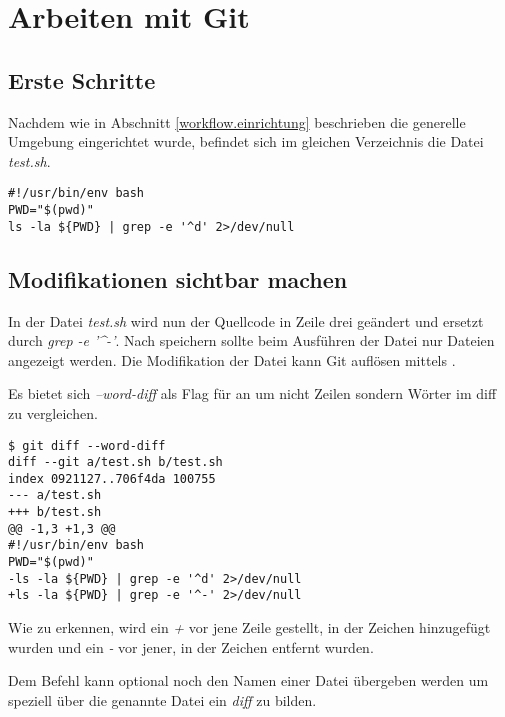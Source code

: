 \section{Arbeiten mit Git}
\label{work-with-git}

\subsection{Erste Schritte}
\label{work-with-git.first-steps}
Nachdem wie in Abschnitt \ref{workflow.einrichtung} beschrieben die generelle Umgebung eingerichtet wurde, befindet sich im gleichen Verzeichnis die Datei \textit{test.sh}.

\begin{verbatim}
#!/usr/bin/env bash
PWD="$(pwd)"
ls -la ${PWD} | grep -e '^d' 2>/dev/null
\end{verbatim}

\subsection{Modifikationen sichtbar machen}
\label{work-with-git.modifikation}
In der Datei \textit{test.sh} wird nun der Quellcode in Zeile drei geändert und ersetzt durch \textit{ grep -e '\^{}-'}. Nach speichern sollte beim Ausführen der Datei nur Dateien angezeigt werden. Die Modifikation der Datei kann Git auflösen mittels \textit{}.

\begin{INFO}
  Es bietet sich \textit{--word-diff} als Flag für \textit{} an um nicht Zeilen sondern Wörter im diff zu vergleichen.
\end{INFO}

\begin{verbatim}
$ git diff --word-diff
diff --git a/test.sh b/test.sh
index 0921127..706f4da 100755
--- a/test.sh
+++ b/test.sh
@@ -1,3 +1,3 @@
#!/usr/bin/env bash
PWD="$(pwd)"
-ls -la ${PWD} | grep -e '^d' 2>/dev/null
+ls -la ${PWD} | grep -e '^-' 2>/dev/null
\end{verbatim}

Wie zu erkennen, wird ein \textit{+} vor jene Zeile gestellt, in der Zeichen hinzugefügt wurden und ein \textit{-} vor jener, in der Zeichen entfernt wurden.

Dem Befehl \textit{} kann optional noch den Namen einer Datei übergeben werden um speziell über die genannte Datei ein \textit{diff} zu bilden.


